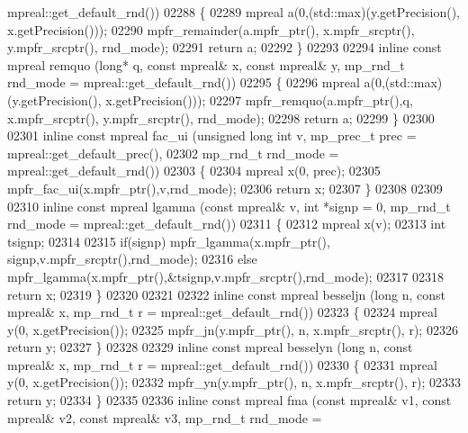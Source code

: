 \begin{DoxyCode}
{{      mpreal::get\_default\_rnd())
02288 \{
02289     mpreal a(0,(std::max)(y.getPrecision(), x.getPrecision()));
02290     mpfr\_remainder(a.mpfr\_ptr(), x.mpfr\_srcptr(), y.mpfr\_srcptr(), rnd\_mode);
02291     \textcolor{keywordflow}{return} a;
02292 \}
02293 
02294 \textcolor{keyword}{inline} \textcolor{keyword}{const} mpreal remquo (\textcolor{keywordtype}{long}* q, \textcolor{keyword}{const} mpreal& x, \textcolor{keyword}{const} mpreal& y, mp\_rnd\_t rnd\_mode = 
      mpreal::get\_default\_rnd())
02295 \{
02296     mpreal a(0,(std::max)(y.getPrecision(), x.getPrecision()));
02297     mpfr\_remquo(a.mpfr\_ptr(),q, x.mpfr\_srcptr(), y.mpfr\_srcptr(), rnd\_mode);
02298     \textcolor{keywordflow}{return} a;
02299 \}
02300 
02301 \textcolor{keyword}{inline} \textcolor{keyword}{const} mpreal fac\_ui (\textcolor{keywordtype}{unsigned} \textcolor{keywordtype}{long} \textcolor{keywordtype}{int} v, mp\_prec\_t prec     = mpreal::get\_default\_prec(),
02302                                            mp\_rnd\_t  rnd\_mode = mpreal::get\_default\_rnd())
02303 \{
02304     mpreal x(0, prec);
02305     mpfr\_fac\_ui(x.mpfr\_ptr(),v,rnd\_mode);
02306     \textcolor{keywordflow}{return} x;
02307 \}
02308 
02309 
02310 \textcolor{keyword}{inline} \textcolor{keyword}{const} mpreal lgamma (\textcolor{keyword}{const} mpreal& v, \textcolor{keywordtype}{int} *signp = 0, mp\_rnd\_t rnd\_mode = mpreal::get\_default\_rnd())
02311 \{
02312     mpreal x(v);
02313     \textcolor{keywordtype}{int} tsignp;
02314 
02315     \textcolor{keywordflow}{if}(signp)   mpfr\_lgamma(x.mpfr\_ptr(),  signp,v.mpfr\_srcptr(),rnd\_mode);
02316     \textcolor{keywordflow}{else}        mpfr\_lgamma(x.mpfr\_ptr(),&tsignp,v.mpfr\_srcptr(),rnd\_mode);
02317 
02318     \textcolor{keywordflow}{return} x;
02319 \}
02320 
02321 
02322 \textcolor{keyword}{inline} \textcolor{keyword}{const} mpreal besseljn (\textcolor{keywordtype}{long} n, \textcolor{keyword}{const} mpreal& x, mp\_rnd\_t r = mpreal::get\_default\_rnd())
02323 \{
02324     mpreal  y(0, x.getPrecision());
02325     mpfr\_jn(y.mpfr\_ptr(), n, x.mpfr\_srcptr(), r);
02326     \textcolor{keywordflow}{return} y;
02327 \}
02328 
02329 \textcolor{keyword}{inline} \textcolor{keyword}{const} mpreal besselyn (\textcolor{keywordtype}{long} n, \textcolor{keyword}{const} mpreal& x, mp\_rnd\_t r = mpreal::get\_default\_rnd())
02330 \{
02331     mpreal  y(0, x.getPrecision());
02332     mpfr\_yn(y.mpfr\_ptr(), n, x.mpfr\_srcptr(), r);
02333     \textcolor{keywordflow}{return} y;
02334 \}
02335 
02336 \textcolor{keyword}{inline} \textcolor{keyword}{const} mpreal fma (\textcolor{keyword}{const} mpreal& v1, \textcolor{keyword}{const} mpreal& v2, \textcolor{keyword}{const} mpreal& v3, mp\_rnd\_t rnd\_mode = 
}}
\end{DoxyCode}
